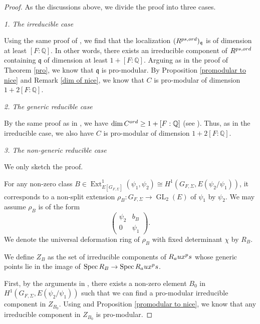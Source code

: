 \documentclass[12pt]{amsart}
\theoremstyle{plain}
\theoremstyle{definition}
\theoremstyle{remark}
\begin{document}
\begin{proof}
	As the discussions above, we divide the proof into three cases.
	
	\textit{1. The irreducible case}
	
	Using the same proof of \cite[Lemma 7.4.7]{pan2022fontaine}, we find that the localization $(R^{\textnormal{ps,ord}})_{\mathfrak{q}}$ is of dimension at least $[F:\mathbb{Q}]$. In other words, there exists an irreducible component of $ R^{\textnormal{ps,ord}}$ containing $\mathfrak{q}$ of dimension at least $1+[F:\mathbb{Q}]$. Arguing as in the proof of Theorem \ref{pro}, we know that $\mathfrak{q}$ is pro-modular. By Proposition \ref{promodular to nice} and Remark \ref{dim of nice}, we know that $C$ is pro-modular of dimension $1+2[F:\mathbb{Q}]$.
	
	\textit{2. The generic reducible case}
	
	By the same proof as in \cite[Section 7.4.4]{pan2022fontaine}, we have $\operatorname{dim} C^{\textnormal{ord}} \ge 1+[F:\mathbb{Q}]$ (see \cite[Corollary 7.4.9]{pan2022fontaine}). Thus, as in the irreducible case, we also have $C$ is pro-modular of dimension $1+2[F:\mathbb{Q}]$.
	
	\textit{3. The non-generic reducible case}
	
	We only sketch the proof. 
	
	For any non-zero class $B\in \operatorname{Ext}^1_{E[G_{F,\Sigma}]}(\psi_1,\psi_2) \cong H^1(G_{F,\Sigma},E(\psi_2/\psi_1))$, it corresponds to a non-split extension $\rho_B: G_{F,\Sigma}\to\operatorname{GL}_2(E)$ of $\psi_1$ by $\psi_2$. We may assume $\rho_B$ is of the form
	\[\begin{pmatrix} \psi_2 & b_B \\ 0 & \psi_1\end{pmatrix}.\] We denote the universal deformation ring of $\rho_B$ with fixed determinant $\chi$ by $R_B$. 
	
	We define $Z_B$ as the set of irreducible components of $R_\textnormal{aux}^\textnormal{ps}$ whose generic points lie in the image of $\operatorname{Spec} R_{B}\to \operatorname{Spec} R_\textnormal{aux}^\textnormal{ps}$. 
	
	First, by the arguments in \cite[Step (1), page 1153]{pan2022fontaine}, there exists a non-zero element $B_0$ in $H^1(G_{F,\Sigma},E(\psi_2/\psi_1)) $ such that we can find a pro-modular irreducible component in $Z_{B_0}$. Using \cite[Corollary 7.4.13]{pan2022fontaine} and Proposition \ref{promodular to nice}, we know that any irreducible component in  $Z_{B_0}$ is pro-modular.
	

\end{proof}
\end{document}

